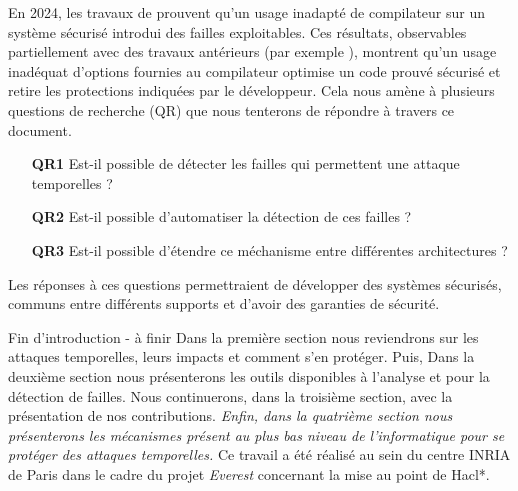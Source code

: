 En 2024, les travaux de \citeauthor{schneider2024breakingbadcompilersbreak} \cite{schneider2024breakingbadcompilersbreak} prouvent qu'un usage inadapté de compilateur sur un système sécurisé introdui des failles exploitables. Ces résultats, observables partiellement avec des travaux antérieurs (par exemple \cite{binsecRel2019}), montrent qu'un usage inadéquat d'options fournies au compilateur optimise un code prouvé sécurisé et retire les protections indiquées par le développeur. Cela nous amène à plusieurs questions de recherche (QR) que nous tenterons de répondre à travers ce document.
\begin{enumerate}
    \item[\textbf{QR1}] Est-il possible de détecter les failles qui permettent une attaque temporelles ?
    \item[\textbf{QR2}] Est-il possible d'automatiser la détection de ces failles ?
    \item[\textbf{QR3}] Est-il possible d'étendre ce méchanisme entre différentes architectures ?
\end{enumerate}

Les réponses à ces questions permettraient de développer des systèmes sécurisés, communs entre différents supports et d'avoir des garanties de sécurité.

\begin{Acorriger}{Fin d'introduction - à finir}
    Dans la première section nous reviendrons sur les attaques temporelles, leurs impacts et comment s'en protéger. Puis, Dans la deuxième section nous présenterons les outils disponibles à l'analyse et pour la détection de failles. Nous continuerons, dans la troisième section, avec la présentation de nos contributions. \textit{Enfin, dans la quatrième section nous présenterons les mécanismes présent au plus bas niveau de l'informatique pour se protéger des attaques temporelles.}\medbreak
    Ce travail a été réalisé au sein du centre INRIA de Paris dans le cadre du projet \textit{Everest} concernant la mise au point de Hacl*.
    
\end{Acorriger}
